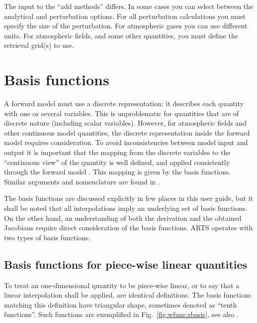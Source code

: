 The input to the ``add methods'' differs. In some cases you can select between
the analytical and perturbation options. For all perturbation calculations you
must specify the size of the perturbation. For atmospheric gases you can use
different units. For atmospheric fields, and some other quantities, you must
define the retrieval grid(s) to use.



 
\section{Basis functions}
\label{sec:wfuns:basis}

A forward model must use a discrete representation: it describes each quantity
with one or several variables. This is unproblematic for quantities that are of
discrete nature (including scalar variables). However, for atmospheric fields
and other continuous model quantities, the discrete representation inside the
forward model requires consideration. To avoid inconsistencies between model
input and output it is important that the mapping from the discrete variables
to the ``continuous view'' of the quantity is well defined, and applied
consistently through the forward model . This mapping is given by the basis
functions. Similar arguments and nomenclature are found
in \citet{read:thecl:06}.

The basis functions are discussed explicitly in few places in this user guide,
but it shall be noted that all interpolations imply an underlying set of basis
functions. On the other hand, an understanding of both the derivation and the
obtained Jacobians require direct consideration of the basis functions. ARTS
operates with two types of basis functions.




\subsection{Basis functions for piece-wise linear quantities}
\label{sec:wfuns:basis1}
%
To treat an one-dimensional quantity to be piece-wise linear, or to say that a
linear interpolation shall be applied, are identical definitions. The basis
functions matching this definition have triangular shape, sometimes denoted as
``tenth functions''. Such functions are exemplified in
Fig.~\ref{fig:wfuns:zbasis}, see also \citet{buehler:artst:05}.

